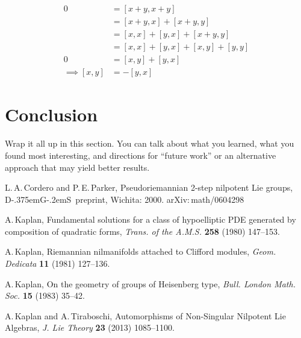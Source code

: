 \documentclass[11 pt]{article}
\newcommand{\DGS}{D{\kern-.375em}G{\kern-.2em}S}
\begin{document}
    \begin{align}
        0 &= [x + y, x + y] 
        \\&= [x + y, x] + [x + y, y]
        \\&= [x,x] + [y, x] + [x + y, y]
        \\&= [x,x] + [y, x] + [x, y] + [y, y]
        \\0&=         [x, y] + [y, x]
        \\\implies [x,y] &= -[y,x]
    \end{align}

\section{Conclusion}

Wrap it all up in this section. You can talk about what you learned, what
you found most interesting, and directions for ``future work'' or an alternative
approach that may yield better results.

\begin{thebibliography}{99}
L.\,A.\,Cordero and P.\,E.\,Parker, Pseudoriemannian 2-step
nilpotent Lie groups, \DGS\ preprint, Wichita: 2000.
{\sf arXiv:\,math/0604298}

A.\,Kaplan, Fundamental solutions for a class of hypoelliptic PDE
generated by composition of quadratic forms, {\it Trans. of the A.M.S.} {\bf 258}
(1980) 147--153.

A.\,Kaplan, Riemannian nilmanifolds attached to Clifford modules,
{\it Geom. Dedicata} {\bf 11} (1981) 127--136.

A.\,Kaplan, On the geometry of groups of Heisenberg type, {\it Bull.
London Math. Soc.} {\bf 15} (1983) 35--42.

A.\,Kaplan and A.\,Tiraboschi, Automorphisms of Non-Singular
Nilpotent Lie Algebras, {\it J. Lie Theory} {\bf 23} (2013) 1085--1100.
\end{thebibliography}
\end{document}
